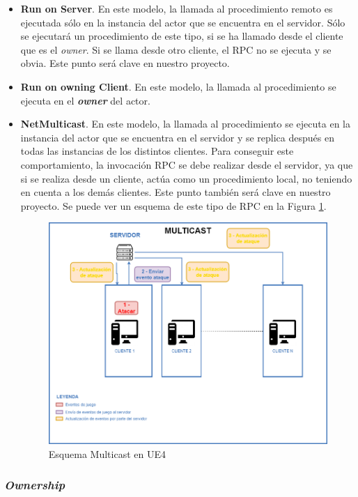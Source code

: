 \begin{itemize}
\item \textbf{Run on Server}. En este modelo, la llamada al procedimiento remoto es ejecutada sólo en la instancia del actor que se encuentra en el servidor. Sólo se ejecutará un procedimiento de este tipo, si se ha llamado desde el cliente que es el \textit{owner}. Si se llama desde otro cliente, el \ac{RPC} no se ejecuta y se obvia. Este punto será clave en nuestro proyecto.
\item \textbf{Run on owning Client}. En este modelo, la llamada al procedimiento se ejecuta en el \textbf{\textit{owner}} del actor.
\item \textbf{NetMulticast}. En este modelo, la llamada al procedimiento se ejecuta en la instancia del actor que se encuentra en el servidor y se replica después en todas las instancias de los distintos clientes. Para conseguir este comportamiento, la invocación \ac{RPC} se debe realizar desde el servidor, ya que si se realiza desde un cliente, actúa como un procedimiento local, no teniendo en cuenta a los demás clientes. Este punto también será clave en nuestro proyecto. Se puede ver un esquema de este tipo de \ac{RPC} en la Figura \ref{Multicast}.

\begin{figure}[H]
  \centering
  \includegraphics[width=13cm]{./images/Multicast.png}
  \caption{Esquema Multicast en \ac{UE4}}
  \label{Multicast}
\end{figure}
\end{itemize}

\subsubsection{\textit{Ownership}}

